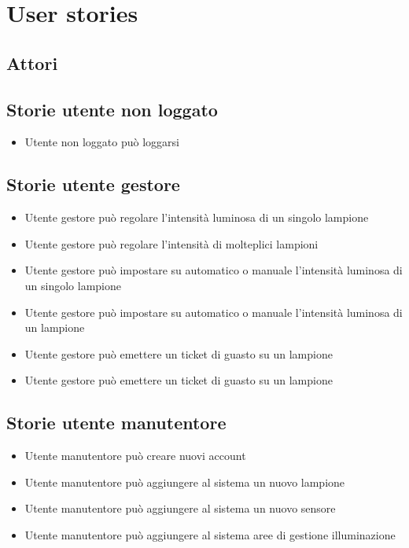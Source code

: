 \chapter{User stories}

\section{Attori}\label{attori}

\section{Storie utente non loggato}

\begin{itemize}
    \item Utente non loggato può loggarsi
\end{itemize}

\section{Storie utente gestore}

\begin{itemize}
    \item Utente gestore può regolare l'intensità luminosa di un singolo lampione
    \item Utente gestore può regolare l'intensità di molteplici lampioni
    \item Utente gestore può impostare su automatico o manuale l'intensità luminosa di un singolo lampione
    \item Utente gestore può impostare su automatico o manuale l'intensità luminosa di un lampione
    \item Utente gestore può emettere un ticket di guasto su un lampione
    \item Utente gestore può emettere un ticket di guasto su un lampione
\end{itemize}



\section{Storie utente manutentore}
\begin{itemize}
    \item Utente manutentore può creare nuovi account
    \item Utente manutentore può aggiungere al sistema un nuovo lampione
    \item Utente manutentore può aggiungere al sistema un nuovo sensore
    \item Utente manutentore può aggiungere al sistema aree di gestione illuminazione
\end{itemize}



